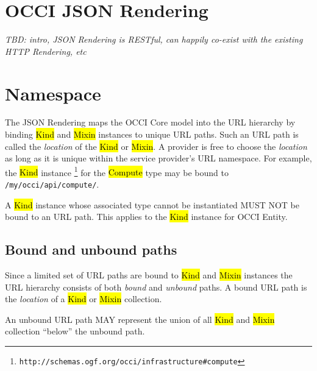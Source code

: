 \documentclass[10pt,a4paper]{article}
\begin{document}
\section{OCCI JSON Rendering}
{\em TBD: intro, JSON Rendering is RESTful, can happily co-exist with the
existing HTTP Rendering, etc}

\section{Namespace}

The JSON Rendering maps the OCCI Core model into the URL hierarchy by binding
\hl{Kind} and \hl{Mixin} instances to unique URL paths. Such an URL path is called
the {\em location} of the \hl{Kind} or \hl{Mixin}.
A provider is free to choose the {\em location} as long as it is unique
within the service provider's URL namespace.
For example, the \hl{Kind} instance%
\footnote{\tt http://schemas.ogf.org/occi/infrastructure\#compute}
for the \hl{Compute} type may be bound to {\tt /my/occi/api/compute/}.

A \hl{Kind} instance whose associated type cannot be instantiated MUST NOT be
bound to an URL path. This applies to the \hl{Kind} instance for OCCI Entity.

\subsection{Bound and unbound paths}

Since a limited set of URL paths are bound to \hl{Kind} and \hl{Mixin}
instances the URL hierarchy consists of both {\em bound} and {\em unbound}
paths.
A bound URL path is the {\em location} of a \hl{Kind} or \hl{Mixin} collection.

An unbound URL path MAY represent the union of all \hl{Kind} and \hl{Mixin}
collection ``below'' the unbound path.

\end{document}
